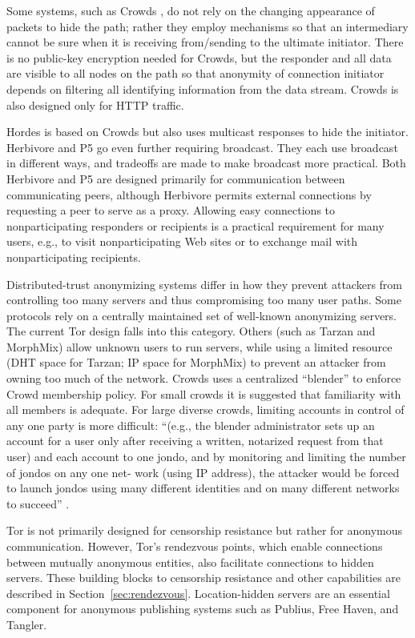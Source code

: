 \documentclass[times,10pt,twocolumn]{article}
\begin{document}
Some systems, such as Crowds \cite{crowds-tissec}, do not rely on the
changing appearance of packets to hide the path; rather they employ
mechanisms so that an intermediary cannot be sure when it is
receiving from/sending to the ultimate initiator. There is no public-key
encryption needed for Crowds, but the responder and all data are
visible to all nodes on the path so that anonymity of connection
initiator depends on filtering all identifying information from the
data stream. Crowds is also designed only for HTTP traffic.

Hordes \cite{hordes-jcs} is based on Crowds but also uses multicast
responses to hide the initiator. Herbivore \cite{herbivore} and
P5 \cite{p5} go even further requiring broadcast.
They each use broadcast in different ways, and tradeoffs are made to
make broadcast more practical. Both Herbivore and P5 are designed primarily
for communication between communicating peers, although Herbivore
permits external connections by requesting a peer to serve as a proxy.
Allowing easy connections to nonparticipating responders or recipients
is a practical requirement for many users, e.g., to visit
nonparticipating Web sites or to exchange mail with nonparticipating
recipients.

Distributed-trust anonymizing systems differ in how they prevent attackers
from controlling too many servers and thus compromising too many user paths.
Some protocols rely on a centrally maintained set of well-known anonymizing
servers.  The current Tor design falls into this category.
Others (such as Tarzan and MorphMix) allow unknown users to run
servers, while using a limited resource (DHT space for Tarzan; IP space for
MorphMix) to prevent an attacker from owning too much of the network.
Crowds uses a centralized ``blender'' to enforce Crowd membership
policy. For small crowds it is suggested that familiarity with all
members is adequate. For large diverse crowds, limiting accounts in
control of any one party is more difficult: 
``(e.g., the blender administrator sets up an account for a user only
after receiving a written, notarized request from that user) and each
account to one jondo, and by monitoring and limiting the number of
jondos on any one net- work (using IP address), the attacker would be
forced to launch jondos using many different identities and on many
different networks to succeed'' \cite{crowds-tissec}.

Tor is not primarily designed for censorship resistance but rather
for anonymous communication. However, Tor's rendezvous points, which
enable connections between mutually anonymous entities, also
facilitate connections to hidden servers.  These building blocks to
censorship resistance and other capabilities are described in
Section~\ref{sec:rendezvous}.  Location-hidden servers are an
essential component for anonymous publishing systems such as
Publius\cite{publius}, Free Haven\cite{freehaven-berk}, and
Tangler\cite{tangler}.
\end{document}
